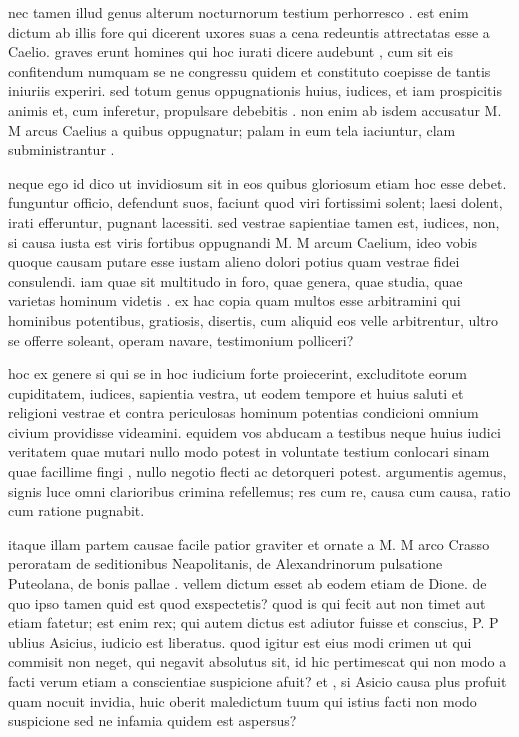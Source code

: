  nec tamen illud genus alterum nocturnorum testium perhorresco . est enim dictum ab illis fore qui dicerent uxores suas a cena redeuntis attrectatas esse a Caelio. graves erunt homines qui hoc iurati dicere audebunt , cum sit eis confitendum numquam se ne congressu quidem et constituto coepisse de tantis iniuriis experiri. sed totum genus oppugnationis huius, iudices, et iam prospicitis animis et, cum inferetur, propulsare debebitis . non enim ab isdem accusatur M. M arcus Caelius a quibus oppugnatur; palam in eum tela iaciuntur, clam subministrantur .

 neque ego id dico ut invidiosum sit in eos quibus gloriosum etiam hoc esse debet. funguntur officio, defendunt suos, faciunt quod viri fortissimi solent; laesi dolent, irati efferuntur, pugnant lacessiti. sed vestrae sapientiae tamen est, iudices, non, si causa iusta est viris fortibus oppugnandi M. M arcum Caelium, ideo vobis quoque causam putare esse iustam alieno dolori potius quam vestrae fidei consulendi. iam quae sit multitudo in foro, quae genera, quae studia, quae varietas hominum videtis . ex hac copia quam multos esse arbitramini qui hominibus potentibus, gratiosis, disertis, cum aliquid eos velle arbitrentur, ultro se offerre soleant, operam navare, testimonium polliceri?

 hoc ex genere si qui se in hoc iudicium forte proiecerint, excluditote eorum cupiditatem, iudices, sapientia vestra, ut eodem tempore et huius saluti et religioni vestrae et contra periculosas hominum potentias condicioni omnium civium providisse videamini. equidem vos abducam a testibus neque huius iudici veritatem quae mutari nullo modo potest in voluntate testium conlocari sinam quae facillime fingi , nullo negotio flecti ac detorqueri potest. argumentis agemus, signis luce omni clarioribus crimina refellemus; res cum re, causa cum causa, ratio cum ratione pugnabit.

 itaque illam partem causae facile patior graviter et ornate a M. M arco Crasso peroratam de seditionibus Neapolitanis, de Alexandrinorum pulsatione Puteolana, de bonis pallae . vellem dictum esset ab eodem etiam de Dione. de quo ipso tamen quid est quod exspectetis? quod is qui fecit aut non timet aut etiam fatetur; est enim rex; qui autem dictus est adiutor fuisse et conscius, P. P ublius Asicius, iudicio est liberatus. quod igitur est eius modi crimen ut qui commisit non neget, qui negavit absolutus sit, id hic pertimescat qui non modo a facti verum etiam a conscientiae suspicione afuit? et , si Asicio causa plus profuit quam nocuit invidia, huic oberit maledictum tuum qui istius facti non modo suspicione sed ne infamia quidem est aspersus?

